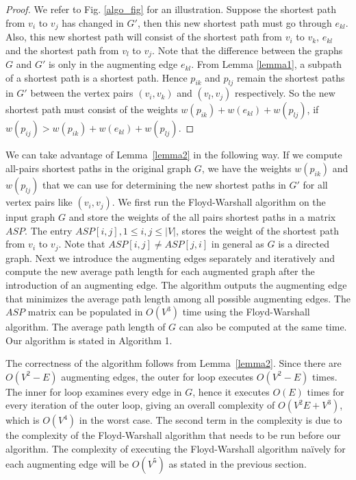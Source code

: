 \documentclass[10pt,letterpaper]{article}
\begin{document}
\begin{proof}
We refer to Fig. \ref{algo_fig} for an illustration. 
Suppose the shortest path from $v_i$ to $v_j$ has changed in $G'$, then this new shortest path must 
go through $e_{kl}$. Also, this new shortest path will consist of the shortest path from $v_i$ to 
$v_k$, $e_{kl}$ and the shortest path from $v_l$ to $v_j$. Note that the difference between the 
graphs $G$ and $G'$ is only in the augmenting edge $e_{kl}$. From Lemma \ref{lemma1}, a subpath of a shortest path 
is a shortest path. Hence $p_{ik}$ and $p_{lj}$ remain the shortest paths in $G'$ between the vertex pairs $(v_i,v_k)$ and 
$(v_l,v_j)$ respectively. So the new shortest path must consist of the weights $w(p_{ik})+w(e_{kl})+w(p_{lj})$,
if  $w(p_{ij})>w(p_{ik})+w(e_{kl})+w(p_{lj})$.
\end{proof}

We can take advantage of Lemma~\ref{lemma2} in the following way. If we compute all-pairs shortest paths 
in the original graph $G$, we have the weights $w(p_{ik})$ and $w(p_{lj})$ that we can use for determining the 
new shortest paths in $G'$ for all vertex pairs like $(v_i,v_j)$. We first run the Floyd-Warshall algorithm on 
the input graph $G$ and store the weights of the all pairs shortest paths in a matrix $ASP$. The entry $ASP[i,j], 1\leq i,j \leq |V|$,
stores the weight of the shortest path from $v_i$ to $v_j$. Note that $ASP[i,j]\not=ASP[j,i]$ in general as 
$G$ is a directed graph. Next we introduce the augmenting edges separately and iteratively and compute the new average path 
length for each augmented graph after the introduction of an augmenting edge. The algorithm outputs the augmenting edge
that minimizes the average path length among all possible augmenting edges. The $ASP$ matrix can be populated 
in $O(V^3)$ time using the Floyd-Warshall algorithm. The average path length of $G$ can 
also be computed at the same time. Our algorithm is stated in 
Algorithm 1.

The correctness of the algorithm follows from Lemma~\ref{lemma2}. Since there are $O(V^2-E)$ augmenting 
edges, the outer for loop executes $O(V^2-E)$ times. The inner for loop examines every edge in $G$, 
hence it executes $O(E)$ times for every iteration of the outer loop, giving an overall complexity of 
$O(V^2E+V^3)$, which is $O(V^4)$ in the worst case. The second term in the complexity is due to the 
complexity of the Floyd-Warshall algorithm that needs to be run before our algorithm. 
The complexity of executing the Floyd-Warshall algorithm 
na\"ively for each augmenting edge will be $O(V^5)$ as stated in the previous section. 
\end{document}
